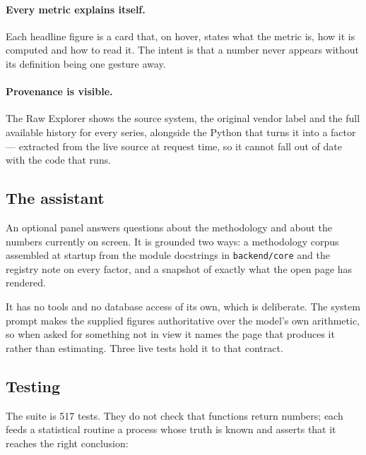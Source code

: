 \documentclass[11pt,a4paper]{article}
\newcommand{\code}[1]{\texttt{\small #1}}
\begin{document}
\paragraph{Every metric explains itself.} Each headline figure is a card that, on
hover, states what the metric is, how it is computed and how to read it. The intent is
that a number never appears without its definition being one gesture away.

\paragraph{Provenance is visible.} The Raw Explorer shows the source system, the
original vendor label and the full available history for every series, alongside the
Python that turns it into a factor --- extracted from the live source at request time,
so it cannot fall out of date with the code that runs.

\subsection{The assistant}

An optional panel answers questions about the methodology and about the numbers
currently on screen. It is grounded two ways: a methodology corpus assembled at
startup from the module docstrings in \code{backend/core} and the registry note on
every factor, and a snapshot of exactly what the open page has rendered.

It has no tools and no database access of its own, which is deliberate. The system
prompt makes the supplied figures authoritative over the model's own arithmetic, so
when asked for something not in view it names the page that produces it rather than
estimating. Three live tests hold it to that contract.

\subsection{Testing}
\label{sec:testing}

The suite is 517 tests. They do not check that functions return numbers; each feeds a
statistical routine a process whose truth is known and asserts that it reaches the
right conclusion:
\end{document}
